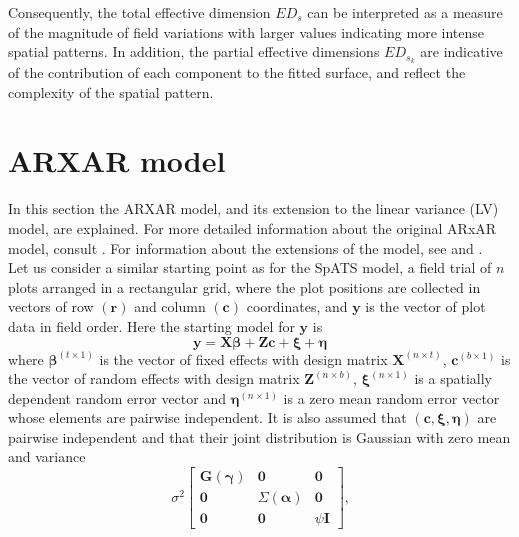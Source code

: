 Consequently, the total effective dimension $ED_{s}$ can be interpreted as a measure of the magnitude of field variations with larger values indicating more intense spatial patterns. In addition, the partial effective dimensions $ED_{s_{k}}$ are indicative of the contribution of each component to the fitted surface, and reflect the complexity of the spatial pattern.




\section{ARXAR model}
In this section the ARXAR model, and its extension to the linear variance (LV) model, are explained. For more detailed information about the original ARxAR model, consult \textcite{gilmour_accounting_1997}. For information about the extensions of the model, see \textcite{Piepho2010} and \textcite{williams_neighbour_1986}.\\
Let us consider a similar starting point as for the SpATS model, a field trial of $n$ plots arranged in a rectangular grid, where the plot positions are collected in vectors of row $(\mathbf{r})$ and column $(\mathbf{c})$ coordinates, and $\mathbf{y}$ is the vector of plot data in field order. Here the starting model for $\mathbf{y}$ is
\begin{equation}
    \mathbf{y}=\mathbf{X} \boldsymbol{\beta}+\mathbf{Z c}+\boldsymbol{\xi}+\boldsymbol{\eta}
    \label{eq:AR_AR_base_model}
\end{equation}
where $\boldsymbol{\beta}^{(t \times 1)}$ is the vector of fixed effects with design matrix $\mathbf{X}^{(n \times t)}$, $\mathbf{c}^{(b \times 1)}$ is the vector of random effects with design matrix $\mathbf{Z}^{(n \times b)}$, $\boldsymbol{\xi}^{(n \times 1)}$ is a spatially dependent random error vector and $\boldsymbol{\eta}^{(n \times 1)}$ is a zero mean random error vector whose elements are pairwise independent. 
It is also assumed that $(\mathbf{c}, \boldsymbol{\xi}, \boldsymbol{\eta})$ are pairwise independent and that their joint distribution is Gaussian with zero mean and variance
\begin{equation}
    \sigma^{2} \left[ 
        \begin{array}{ccc}{\mathbf{G}(\boldsymbol{\gamma})} & {\mathbf{0}} & {\mathbf{0}} \\ {\mathbf{0}} & {\Sigma(\boldsymbol{\alpha})} & {\mathbf{0}} \\ {\mathbf{0}} & {\mathbf{0}} & {\psi \mathbf{I}}
        \end{array}
    \right]
    \text{,}
\end{equation}
